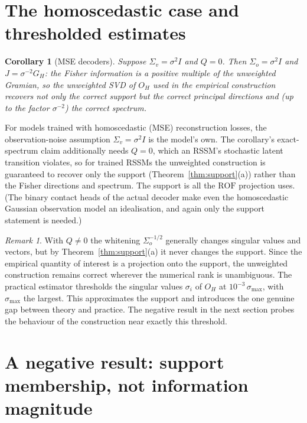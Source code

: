 \documentclass[11pt]{article}
\newtheorem{corollary}{Corollary}
\theoremstyle{remark}
\newtheorem{remark}{Remark}
\newcommand{\ROF}{\mathrm{ROF}}
\begin{document}
\section{The homoscedastic case and thresholded estimates}\label{sec:homoscedastic}

\begin{corollary}[MSE decoders]\label{cor:mse}
Suppose $\Sigma_v = \sigma^2 I$ and $Q = 0$. Then $\Sigma_o = \sigma^2 I$ and $J = \sigma^{-2} G_H$: the Fisher information is a positive multiple of the unweighted Gramian, so the unweighted SVD of $O_H$ used in the empirical construction recovers not only the correct support but the correct principal directions and (up to the factor $\sigma^{-2}$) the correct spectrum.
\end{corollary}

For models trained with homoscedastic (MSE) reconstruction losses, the observation-noise assumption $\Sigma_v = \sigma^2 I$ is the model's own. The corollary's exact-spectrum claim additionally needs $Q = 0$, which an RSSM's stochastic latent transition violates, so for trained RSSMs the unweighted construction is guaranteed to recover only the support (Theorem~\ref{thm:support}(a)) rather than the Fisher directions and spectrum. The support is all the $\ROF$ projection uses. (The binary contact heads of the actual decoder make even the homoscedastic Gaussian observation model an idealisation, and again only the support statement is needed.)

\begin{remark}
With $Q \ne 0$ the whitening $\Sigma_o^{-1/2}$ generally changes singular values and vectors, but by Theorem~\ref{thm:support}(a) it never changes the support. Since the empirical quantity of interest is a projection onto the support, the unweighted construction remains correct wherever the numerical rank is unambiguous. The practical estimator thresholds the singular values $\sigma_i$ of $O_H$ at $10^{-3}\,\sigma_{\max}$, with $\sigma_{\max}$ the largest. This approximates the support and introduces the one genuine gap between theory and practice. The negative result in the next section probes the behaviour of the construction near exactly this threshold.
\end{remark}

\section{A negative result: support membership, not information magnitude}\label{sec:negative}
\end{document}
